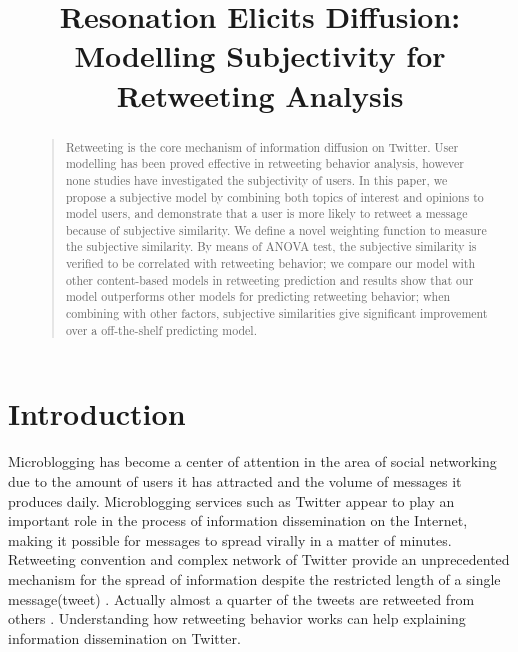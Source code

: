 \documentclass[letterpaper]{article}
\begin{document}
%
\title{Resonation Elicits Diffusion: \\Modelling Subjectivity for Retweeting Analysis}
\maketitle
\begin{abstract}
\begin{quote}
Retweeting is the core mechanism of information diffusion on Twitter. User modelling has been proved effective in  retweeting behavior analysis, however none studies have investigated the subjectivity of users. 
In this paper, we propose a subjective model by combining both topics of interest and opinions to model users, and demonstrate that a user is more likely to retweet a message because of subjective similarity. 
We define a novel weighting function to measure the subjective similarity. 
By means of ANOVA test, the subjective similarity is verified to be correlated with  retweeting behavior;  
we compare our model with other content-based models in retweeting prediction and results show that our model  outperforms other models for predicting retweeting behavior; 
when combining with other factors, subjective similarities give significant improvement over a off-the-shelf predicting model.
\end{quote}
\end{abstract}

\section{Introduction}
\label{introduction}
\noindent Microblogging has become a center of attention in the area of social networking due to the amount of users it has attracted and the volume of messages it produces daily. 
Microblogging services such as Twitter appear to play an important role in the process of information dissemination on the Internet, making it possible for messages to spread virally in a matter of minutes. 
Retweeting convention and complex network of Twitter provide an unprecedented mechanism for the spread of information despite the restricted length of a single message(tweet) \cite{Jenders:2013APV}. 
Actually almost a quarter of the tweets are retweeted from others \cite{conf/cikm/YangGCTLZS10}. 
Understanding how retweeting behavior works can help explaining information dissemination on Twitter. 
\end{document}
